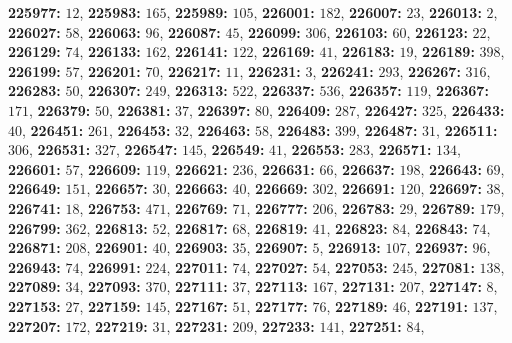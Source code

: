 \textsf{\bfseries 225977:} $12$, \textsf{\bfseries 225983:} $165$, \textsf{\bfseries 225989:} $105$, \textsf{\bfseries 226001:} $182$, \textsf{\bfseries 226007:} $23$, \textsf{\bfseries 226013:} $2$, \textsf{\bfseries 226027:} $58$, \textsf{\bfseries 226063:} $96$, \textsf{\bfseries 226087:} $45$, \textsf{\bfseries 226099:} $306$, \textsf{\bfseries 226103:} $60$, \textsf{\bfseries 226123:} $22$, \textsf{\bfseries 226129:} $74$, \textsf{\bfseries 226133:} $162$, \textsf{\bfseries 226141:} $122$, \textsf{\bfseries 226169:} $41$, \textsf{\bfseries 226183:} $19$, \textsf{\bfseries 226189:} $398$, \textsf{\bfseries 226199:} $57$, \textsf{\bfseries 226201:} $70$, \textsf{\bfseries 226217:} $11$, \textsf{\bfseries 226231:} $3$, \textsf{\bfseries 226241:} $293$, \textsf{\bfseries 226267:} $316$, \textsf{\bfseries 226283:} $50$, \textsf{\bfseries 226307:} $249$, \textsf{\bfseries 226313:} $522$, \textsf{\bfseries 226337:} $536$, \textsf{\bfseries 226357:} $119$, \textsf{\bfseries 226367:} $171$, \textsf{\bfseries 226379:} $50$, \textsf{\bfseries 226381:} $37$, \textsf{\bfseries 226397:} $80$, \textsf{\bfseries 226409:} $287$, \textsf{\bfseries 226427:} $325$, \textsf{\bfseries 226433:} $40$, \textsf{\bfseries 226451:} $261$, \textsf{\bfseries 226453:} $32$, \textsf{\bfseries 226463:} $58$, \textsf{\bfseries 226483:} $399$, \textsf{\bfseries 226487:} $31$, \textsf{\bfseries 226511:} $306$, \textsf{\bfseries 226531:} $327$, \textsf{\bfseries 226547:} $145$, \textsf{\bfseries 226549:} $41$, \textsf{\bfseries 226553:} $283$, \textsf{\bfseries 226571:} $134$, \textsf{\bfseries 226601:} $57$, \textsf{\bfseries 226609:} $119$, \textsf{\bfseries 226621:} $236$, \textsf{\bfseries 226631:} $66$, \textsf{\bfseries 226637:} $198$, \textsf{\bfseries 226643:} $69$, \textsf{\bfseries 226649:} $151$, \textsf{\bfseries 226657:} $30$, \textsf{\bfseries 226663:} $40$, \textsf{\bfseries 226669:} $302$, \textsf{\bfseries 226691:} $120$, \textsf{\bfseries 226697:} $38$, \textsf{\bfseries 226741:} $18$, \textsf{\bfseries 226753:} $471$, \textsf{\bfseries 226769:} $71$, \textsf{\bfseries 226777:} $206$, \textsf{\bfseries 226783:} $29$, \textsf{\bfseries 226789:} $179$, \textsf{\bfseries 226799:} $362$, \textsf{\bfseries 226813:} $52$, \textsf{\bfseries 226817:} $68$, \textsf{\bfseries 226819:} $41$, \textsf{\bfseries 226823:} $84$, \textsf{\bfseries 226843:} $74$, \textsf{\bfseries 226871:} $208$, \textsf{\bfseries 226901:} $40$, \textsf{\bfseries 226903:} $35$, \textsf{\bfseries 226907:} $5$, \textsf{\bfseries 226913:} $107$, \textsf{\bfseries 226937:} $96$, \textsf{\bfseries 226943:} $74$, \textsf{\bfseries 226991:} $224$, \textsf{\bfseries 227011:} $74$, \textsf{\bfseries 227027:} $54$, \textsf{\bfseries 227053:} $245$, \textsf{\bfseries 227081:} $138$, \textsf{\bfseries 227089:} $34$, \textsf{\bfseries 227093:} $370$, \textsf{\bfseries 227111:} $37$, \textsf{\bfseries 227113:} $167$, \textsf{\bfseries 227131:} $207$, \textsf{\bfseries 227147:} $8$, \textsf{\bfseries 227153:} $27$, \textsf{\bfseries 227159:} $145$, \textsf{\bfseries 227167:} $51$, \textsf{\bfseries 227177:} $76$, \textsf{\bfseries 227189:} $46$, \textsf{\bfseries 227191:} $137$, \textsf{\bfseries 227207:} $172$, \textsf{\bfseries 227219:} $31$, \textsf{\bfseries 227231:} $209$, \textsf{\bfseries 227233:} $141$, \textsf{\bfseries 227251:} $84$, 
